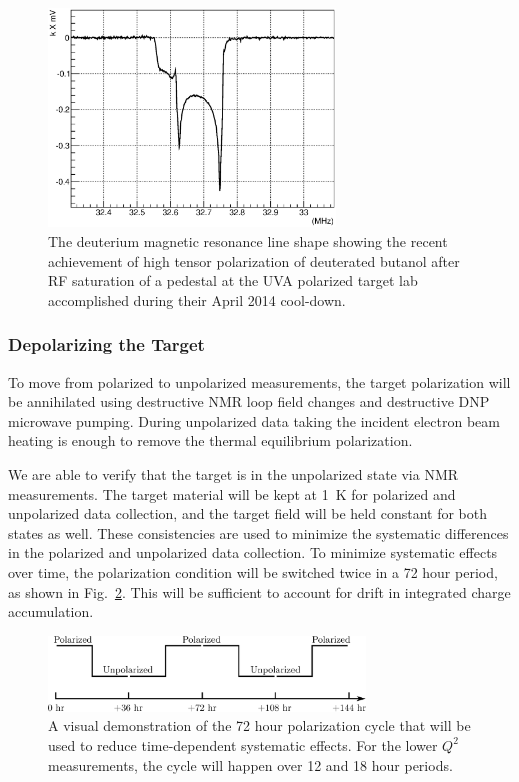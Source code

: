 \begin{figure}
\centering
\includegraphics[width=3.0in,clip]{figs/study.eps}
\caption{The deuterium magnetic resonance line shape showing the recent achievement of 
high tensor polarization of deuterated butanol after RF saturation of a pedestal at the UVA polarized target lab accomplished during their April 2014 cool-down.}  
\label{fig:study}
\end{figure}

\subsubsection{Depolarizing the Target}
To move from polarized to unpolarized measurements, the target
polarization will be annihilated using destructive NMR loop field changes and destructive DNP microwave pumping.
During unpolarized data taking the incident electron beam heating is enough to remove the thermal equilibrium polarization.

We are able to verify that the target is in the unpolarized state via NMR measurements.  The target material will be
kept at 1~K for polarized and unpolarized data collection, and the target field
will be held constant for both states as well.  These
consistencies are used to minimize the systematic differences in the
polarized and unpolarized data collection.  To minimize systematic effects over
time, the polarization condition will be switched twice in a 72 hour period, as shown in Fig.~\ref{fig:polcycle}. 
This will be sufficient to account for drift in integrated charge accumulation.

\begin{figure}
\centering
\includegraphics[width=0.75\textwidth,clip]{figs/pol_cycle.eps}
\caption{A visual demonstration of the 72 hour polarization cycle that will be used to reduce time-dependent systematic effects. For the lower $Q^2$ measurements, the cycle will happen over 12 and 18 hour periods.}  
\label{fig:polcycle}
\end{figure}

